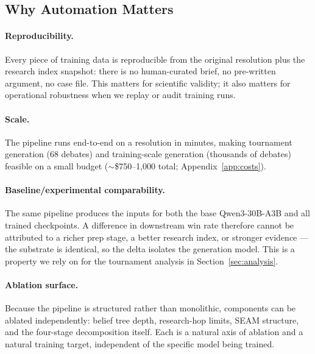 \subsection{Why Automation Matters}

\paragraph{Reproducibility.}
Every piece of training data is reproducible from the original resolution
plus the research index snapshot: there is no human-curated brief, no
pre-written argument, no case file. This matters for scientific validity;
it also matters for operational robustness when we replay or audit
training runs.

\paragraph{Scale.}
The pipeline runs end-to-end on a resolution in minutes, making tournament
generation (68 debates) and training-scale generation (thousands of
debates) feasible on a small budget ($\sim$\$750--1{,}000 total;
Appendix~\ref{app:costs}).

\paragraph{Baseline/experimental comparability.}
The same pipeline produces the inputs for both the base Qwen3-30B-A3B and
all trained checkpoints. A difference in downstream win rate therefore
cannot be attributed to a richer prep stage, a better research index, or
stronger evidence --- the substrate is identical, so the delta isolates the
generation model. This is a property we rely on for the tournament
analysis in Section~\ref{sec:analysis}.

\paragraph{Ablation surface.}
Because the pipeline is structured rather than monolithic, components can
be ablated independently: belief tree depth, research-hop limits, SEAM
structure, and the four-stage decomposition itself. Each is a natural
axis of ablation and a natural training target, independent of the
specific model being trained.
